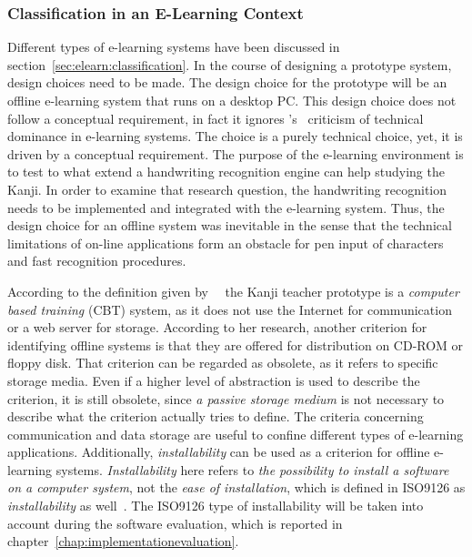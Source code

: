 \subsubsection{Classification in an E-Learning Context}
\label{sec:concept:classificationinelearning}

Different types of e-learning systems have been discussed in 
section~\ref{sec:elearn:classification}. In the course of designing a prototype 
system, design choices need to be made.
The design choice for the prototype will be an offline e-learning system that 
runs on a desktop PC.
This design choice does not follow a conceptual requirement, in fact it ignores
's~\citeyear{Ivashin2009} criticism of technical 
dominance in e-learning systems. The choice is a purely technical choice, 
yet, it is driven by a conceptual requirement.
The purpose of the e-learning environment is to test to what extend a handwriting
recognition engine can help studying the Kanji. In order to examine that 
research question, the handwriting recognition needs to be implemented and 
integrated with the e-learning system. 
Thus, the design choice for an offline system was inevitable in the sense that 
the technical limitations of on-line applications form an obstacle for pen 
input of characters and fast recognition procedures.

According to the definition given 
by~~\citeyear{Richert2007} the Kanji teacher 
prototype is a \emph{computer based training} (CBT) system, as it does not use 
the Internet for communication or a web server for storage. 
According to her research, another criterion for identifying offline systems 
is that they are offered for distribution on CD-ROM or floppy disk.
That criterion can be regarded as obsolete, as it refers to specific storage 
media. Even if a higher level of abstraction is used to describe the
criterion, it is still obsolete, since \emph{a passive storage medium} is not 
necessary to describe what the criterion actually tries to define.
The criteria concerning communication and data storage are useful to confine
different types of e-learning applications.
Additionally, \emph{installability} can be used as a criterion for offline 
e-learning systems. \emph{Installability} here refers to 
\emph{the possibility to install a software on a computer system}, 
not the \emph{ease of installation}, 
which is defined in ISO9126 as \emph{installability} as 
well~. 
The ISO9126 type of installability will be taken into account during the software
evaluation, which is reported in chapter~\ref{chap:implementationevaluation}.

